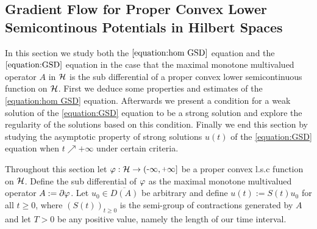 
\subsection{Gradient Flow for Proper Convex Lower Semicontinous 
	Potentials in Hilbert Spaces}
In this section we study both the $ \ref{equation:hom GSD} $ equation
and the $ \ref{equation:GSD} $ equation
in the case that the maximal monotone multivalued operator $ A $
in $ \mathcal{H} $ is the sub differential of a proper convex lower semicontinuous function
on $ \mathcal{H} $. First we deduce some properties and estimates of the \ref{equation:hom GSD}
equation. Afterwards we present a condition for a weak solution
of the \ref{equation:GSD} equation to be a strong solution and explore
the regularity of the solutions based on this condition.
Finally we end this section by studying the asymptotic property
of strong solutions $ u(t) $ of the \ref{equation:GSD} equation
when $ t\nearrow\plus\infty $ under certain criteria.
\medskip

Throughout this section let $ \vp:\rH\ra(\minus\infty,\plus\infty] $ 
be a proper convex l.s.c function on 
$ \mathcal{H} $. Define the sub differential of $ \varphi $ as the maximal monotone 
multivalued operator $ A:=\partial \varphi $. Let $ u_0\in\overline{D(A)} $
be arbitrary and define $ u(t):=S(t)u_0 $ for all $ t\geq 0 $,
where $ (S(t))_{t\geq 0} $ is the semi-group of 
contractions generated by $ A $ and let $ T>0 $ be any positive value, namely the length of our time interval.
\medskip

